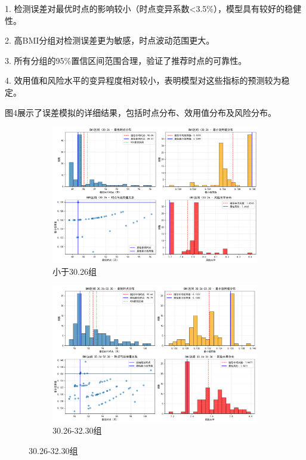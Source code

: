 \documentclass{article}
\begin{document}
1. 检测误差对最优时点的影响较小（时点变异系数<3.5\%），模型具有较好的稳健性。

2. 高BMI分组对检测误差更为敏感，时点波动范围更大。

3. 所有分组的95\%置信区间范围合理，验证了推荐时点的可靠性。

4. 效用值和风险水平的变异程度相对较小，表明模型对这些指标的预测较为稳定。

图4展示了误差模拟的详细结果，包括时点分布、效用值分布及风险分布。
\begin{figure}[H]
    \centering
    \begin{subfigure}[b]{0.35\textwidth}  %
        \centering
        \includegraphics[width=\textwidth]{graph/error_analysis_BMI__30.26.png}  %
        \caption{小于30.26组}  %
        \label{fig:sub1}  %
    \end{subfigure}
    \hspace{0.05\textwidth}  %
    \begin{subfigure}[b]{0.35\textwidth}
        \centering
        \includegraphics[width=\textwidth]{graph/error_analysis_BMI_30.26-32.30.png}
        \caption{30.26-32.30组}
        \label{fig:sub2}
    \end{subfigure}
    \label{fig:two}  %
\end{figure}
\end{document}
